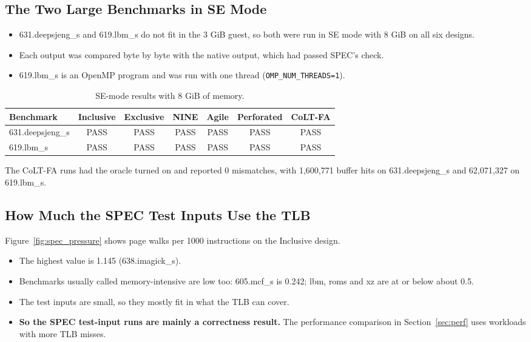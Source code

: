 \subsection{The Two Large Benchmarks in SE Mode}
\begin{itemize}
    \item 631.deepsjeng\_s and 619.lbm\_s do not fit in the 3 GiB guest, so both were run in SE mode with 8 GiB on all six designs.
    \item Each output was compared byte by byte with the native output, which had passed SPEC's check.
    \item 619.lbm\_s is an OpenMP program and was run with one thread (\texttt{OMP\_NUM\_THREADS=1}).
\end{itemize}

\begin{table}[htbp]
\centering
\small
\caption{SE-mode results with 8 GiB of memory.}
\label{tab:se_bigmem}
\begin{tabular}{l c c c c c c}
\toprule
\textbf{Benchmark} & \textbf{Inclusive} & \textbf{Exclusive} & \textbf{NINE} & \textbf{Agile} & \textbf{Perforated} & \textbf{CoLT-FA} \\
\midrule
631.deepsjeng\_s & PASS & PASS & PASS & PASS & PASS & PASS \\
619.lbm\_s & PASS & PASS & PASS & PASS & PASS & PASS \\
\bottomrule
\end{tabular}
\end{table}

\noindent The CoLT-FA runs had the oracle turned on and reported 0 mismatches, with 1,600,771 buffer hits on 631.deepsjeng\_s and 62,071,327 on 619.lbm\_s.

\subsection{How Much the SPEC Test Inputs Use the TLB}
Figure~\ref{fig:spec_pressure} shows page walks per 1000 instructions on the Inclusive design.
\begin{itemize}
    \item The highest value is 1.145 (638.imagick\_s).
    \item Benchmarks usually called memory-intensive are low too: 605.mcf\_s is 0.242; lbm, roms and xz are at or below about 0.5.
    \item The test inputs are small, so they mostly fit in what the TLB can cover.
    \item \textbf{So the SPEC test-input runs are mainly a correctness result.} The performance comparison in Section~\ref{sec:perf} uses workloads with more TLB misses.
\end{itemize}

